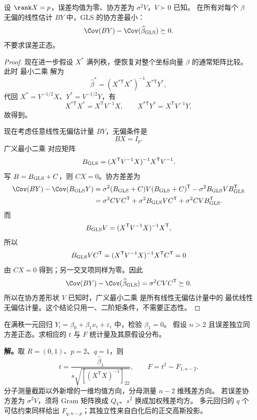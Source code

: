 \begin{theorem}

\label{thm:math-linear-gauss-markov}
设 $\rank X=p$，误差均值为零、协方差为 $\sigma^2V$，$V\succ0$ 已知。
在所有对每个 $\beta$ 无偏的线性估计 $BY$ 中，GLS 的协方差最小：
\[
 \Cov(BY)-\Cov(\widehat\beta_{\rm GLS})\succeq0.
\]
不要求误差正态。

\end{theorem}
\begin{proof}
现在进一步假设 $X^*$ 满列秩，便恢复对整个坐标向量 $\beta$ 的通常矩阵比较。此时 最小二乘 解为
\[
 \widehat\beta^*
 =(X^{*\mathsf T}X^*)^{-1}X^{*\mathsf T}Y^*,
\]
代回 $X^*=V^{-1/2}X$、$Y^*=V^{-1/2}Y$，有
\[
 X^{*\mathsf T}X^*=X^{\mathsf T}V^{-1}X,
 \qquad
 X^{*\mathsf T}Y^*=X^{\mathsf T}V^{-1}Y,
\]
故得到。

现在考虑任意线性无偏估计量 $BY$，无偏条件是
\[
 BX=I_p.
\]
广义最小二乘 对应矩阵
\[
 B_{\rm GLS}=(X^{\mathsf T}V^{-1}X)^{-1}X^{\mathsf T}V^{-1}.
\]
写 $B=B_{\rm GLS}+C$，则 $CX=0$。协方差差为
\begin{align*}
 \Cov(BY)-\Cov(B_{\rm GLS}Y)
 &=\sigma^2(B_{\rm GLS}+C)V(B_{\rm GLS}+C)^{\mathsf T}
   -\sigma^2B_{\rm GLS}VB_{\rm GLS}^{\mathsf T}\\
 &=\sigma^2CV C^{\mathsf T}
  +\sigma^2B_{\rm GLS}VC^{\mathsf T}
  +\sigma^2CV B_{\rm GLS}^{\mathsf T}.
\end{align*}
而
\[
 B_{\rm GLS}V
 =(X^{\mathsf T}V^{-1}X)^{-1}X^{\mathsf T},
\]
所以
\[
 B_{\rm GLS}VC^{\mathsf T}
 =(X^{\mathsf T}V^{-1}X)^{-1}X^{\mathsf T}C^{\mathsf T}
 =0
\]
由 $CX=0$ 得到；另一交叉项同样为零。因此
\[
 \Cov(BY)-\Cov(\widehat\beta_{\rm GLS})
 =\sigma^2CVC^{\mathsf T}\succeq0.
\]
所以在协方差形状 $V$ 已知时，广义最小二乘 是所有线性无偏估计量中的 最优线性无偏估计量。这个结论只用一、二阶矩条件，不需要正态性。
\end{proof}




\begin{workedexample}[斜率检验是一个新增方向]
在满秩一元回归 $Y_i=\beta_0+\beta_1x_i+\varepsilon_i$ 中，检验 $\beta_1=0$。
假设 $n>2$ 且误差独立同方差正态。求相应的 $t$ 与 $F$ 统计量及其原假设分布。

\textbf{解。}取 $R=(0,1)$、$p=2$、$q=1$，则
\[
 t=\frac{\widehat\beta_1}{s\sqrt{[(X^{\mathsf T}X)^{-1}]_{22}}},\qquad
 F=t^2\sim F_{1,n-2}.
\]
分子测量截距以外新增的一维均值方向，分母测量 $n-2$ 维残差方向。
若误差协方差为 $\sigma^2V$，须将 Gram 矩阵换成 $Q_V$、$s^2$ 换成加权残差均方。
多元回归的 $q$ 个可估约束同样给出 $F_{q,n-p}$；其独立性来自白化后的正交高斯投影。
\end{workedexample}


